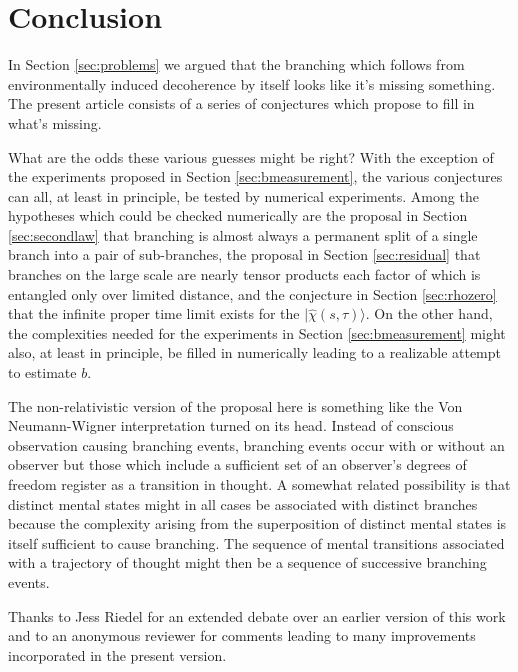 \documentclass[twocolumn,amsmath,amssymb]{revtex4-1}
\begin{document}
\section{\label{sec:conclusion}Conclusion}

In Section \ref{sec:problems} we argued
that the branching which follows from environmentally induced decoherence
by itself looks like it's missing something. 
The present article consists of a series of
conjectures which propose to fill in what's missing. 

What are the odds these various guesses might be right?
With the exception of the experiments
proposed in Section \ref{sec:bmeasurement},
the various conjectures can all, at least in principle,
be tested by numerical experiments.
Among the hypotheses which could be checked numerically
are the proposal in Section \ref{sec:secondlaw}
that branching is almost always a permanent split of a
single branch into a pair of sub-branches, 
the proposal in Section \ref{sec:residual} that branches
on the large scale are nearly tensor products each factor of which is
entangled only over limited distance, and the conjecture
in Section \ref{sec:rhozero} that the
infinite proper time limit exists for the $|\hat{\chi}(s, \tau) \rangle $.
On the other hand, the complexities needed for the
experiments in Section \ref{sec:bmeasurement}
might also, at least in principle, be filled in numerically
leading to a realizable attempt to estimate $b$.

The non-relativistic version of the proposal here is something like the Von Neumann-Wigner
interpretation \cite{Vonneumann, Wigner, London} turned on its head. Instead of
conscious
observation causing branching events, branching
events occur with or without an observer but
those which include a sufficient set of
an observer's degrees of freedom
register as a transition in thought.
A somewhat related
possibility is that
distinct mental
states might in all cases be associated with
distinct branches because
the complexity arising from
the superposition of distinct mental states
is itself sufficient to cause branching.
The sequence 
of mental transitions associated with a trajectory of
thought might then be a sequence of successive
branching events.




\begin{acknowledgments}
Thanks to Jess Riedel for an extended debate over an earlier
version of this work and to an anonymous reviewer for
comments leading to many improvements incorporated in the present version.
\end{acknowledgments}
\end{document}
